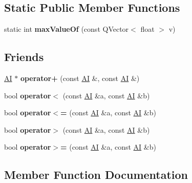 \subsection*{Static Public Member Functions}
\begin{DoxyCompactItemize}
\item 
\mbox{\label{classAI_a864dc398addb033871e745bdd531375b}} 
static int {\bfseries max\+Value\+Of} (const Q\+Vector$<$ float $>$ v)
\end{DoxyCompactItemize}
\subsection*{Friends}
\begin{DoxyCompactItemize}
\item 
\mbox{\label{classAI_a603488eb9c51e35d098875bfef26ae6b}} 
\hyperlink{classAI}{AI} $\ast$ {\bfseries operator+} (const \hyperlink{classAI}{AI} \&, const \hyperlink{classAI}{AI} \&)
\item 
\mbox{\label{classAI_a4e43a95ad357cdc9a98735958b0c6fa4}} 
bool {\bfseries operator$<$} (const \hyperlink{classAI}{AI} \&a, const \hyperlink{classAI}{AI} \&b)
\item 
\mbox{\label{classAI_a8685adc9a5fb5397423dd97deef7e733}} 
bool {\bfseries operator$<$=} (const \hyperlink{classAI}{AI} \&a, const \hyperlink{classAI}{AI} \&b)
\item 
\mbox{\label{classAI_a83c936475bdbb2c3b7a615f26c0b0b20}} 
bool {\bfseries operator$>$} (const \hyperlink{classAI}{AI} \&a, const \hyperlink{classAI}{AI} \&b)
\item 
\mbox{\label{classAI_a9f2bf11a0a8c5b305e4dfd0bf0b9533d}} 
bool {\bfseries operator$>$=} (const \hyperlink{classAI}{AI} \&a, const \hyperlink{classAI}{AI} \&b)
\end{DoxyCompactItemize}


\subsection{Member Function Documentation}
\mbox{\label{classAI_a5ddd05acc3177d4e7a756f7cfc2c3f64}} 
